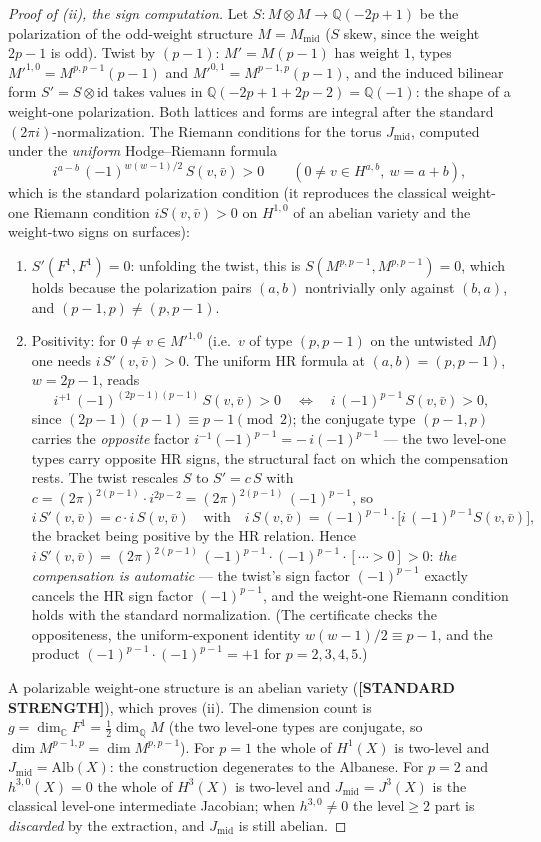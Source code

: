 \documentclass[11pt]{article}
\newcommand{\STANDARD}{\textbf{[STANDARD STRENGTH]}}
\newcommand{\Q}{\mathbb{Q}}
\newcommand{\C}{\mathbb{C}}
\begin{document}
\begin{proof}[Proof of (ii), the sign computation]
Let $S\colon M\otimes M\to\Q(-2p+1)$ be the polarization of the odd-weight
structure $M=M_{\mathrm{mid}}$ ($S$ skew, since the weight $2p-1$ is odd).
Twist by $(p-1)$: $M'=M(p-1)$ has weight $1$, types
$M'^{1,0}=M^{p,p-1}(p-1)$ and $M'^{0,1}=M^{p-1,p}(p-1)$, and the induced
bilinear form $S'=S\otimes\mathrm{id}$ takes values in
$\Q(-2p+1+2p-2)=\Q(-1)$: the shape of a weight-one polarization. Both
lattices and forms are integral after the standard $(2\pi i)$-normalization.
The Riemann conditions for the torus $J_{\mathrm{mid}}$, computed under the
\emph{uniform} Hodge--Riemann formula
\[
i^{a-b}\,(-1)^{w(w-1)/2}\,S(v,\bar v)>0
\qquad(0\ne v\in H^{a,b},\ w=a+b),
\]
which is the standard polarization condition (it reproduces the classical
weight-one Riemann condition $iS(v,\bar v)>0$ on $H^{1,0}$ of an abelian
variety and the weight-two signs on surfaces):
\begin{enumerate}[label=(R\arabic*)]
\item $S'(F^1,F^1)=0$: unfolding the twist, this is
$S(M^{p,p-1},M^{p,p-1})=0$, which holds because the polarization pairs
$(a,b)$ nontrivially only against $(b,a)$, and
$(p-1,p)\ne(p,p-1)$.
\item Positivity: for $0\ne v\in M'^{1,0}$ (i.e.\ $v$ of type $(p,p-1)$ on
the untwisted $M$) one needs $i\,S'(v,\bar v)>0$. The uniform HR formula at
$(a,b)=(p,p-1)$, $w=2p-1$, reads
\[
i^{+1}\,(-1)^{(2p-1)(p-1)}\,S(v,\bar v)>0
\quad\Longleftrightarrow\quad
i\,(-1)^{p-1}\,S(v,\bar v)>0,
\]
since $(2p-1)(p-1)\equiv p-1\pmod 2$; the conjugate type $(p-1,p)$ carries
the \emph{opposite} factor $i^{-1}(-1)^{p-1}=-\,i(-1)^{p-1}$ --- the two
level-one types carry opposite HR signs, the structural fact on which the
compensation rests. The twist rescales $S$ to $S'=c\,S$ with
$c=(2\pi)^{2(p-1)}\cdot i^{2p-2}=(2\pi)^{2(p-1)}\,(-1)^{p-1}$, so
\[
i\,S'(v,\bar v)=c\cdot i\,S(v,\bar v)
\quad\text{with}\quad
i\,S(v,\bar v)=(-1)^{p-1}\cdot\big[i\,(-1)^{p-1}S(v,\bar v)\big],
\]
the bracket being positive by the HR relation. Hence
$i\,S'(v,\bar v)=(2\pi)^{2(p-1)}\,(-1)^{p-1}\cdot(-1)^{p-1}\cdot[\cdots>0]>0$:
\emph{the compensation is automatic} --- the twist's sign factor
$(-1)^{p-1}$ exactly cancels the HR sign factor $(-1)^{p-1}$, and the
weight-one Riemann condition holds with the standard normalization. (The
certificate checks the oppositeness, the uniform-exponent identity
$w(w-1)/2\equiv p-1$, and the product $(-1)^{p-1}\cdot(-1)^{p-1}=+1$ for
$p=2,3,4,5$.)
\end{enumerate}
A polarizable weight-one structure is an abelian variety (\STANDARD{}), which
proves (ii). The dimension count is
$g=\dim_\C F^1=\tfrac12\dim_\Q M$ (the two level-one types are conjugate, so
$\dim M^{p-1,p}=\dim M^{p,p-1}$). For $p=1$ the whole of $H^1(X)$ is
two-level and $J_{\mathrm{mid}}=\mathrm{Alb}(X)$: the construction degenerates
to the Albanese. For $p=2$ and $h^{3,0}(X)=0$ the whole of $H^3(X)$ is
two-level and $J_{\mathrm{mid}}=J^3(X)$ is the classical level-one
intermediate Jacobian; when $h^{3,0}\ne0$ the level${}\ge{}2$ part is
\emph{discarded} by the extraction, and $J_{\mathrm{mid}}$ is still abelian.
\end{proof}
\end{document}
